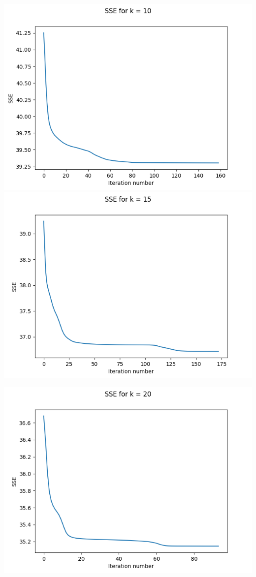 \documentclass{article}
\begin{document}
\begin{center}
    \includegraphics[scale=0.4]{images/task1_5_graph_10.png}
    \includegraphics[scale=0.4]{images/task1_5_graph_15.png}
\end{center}

\begin{center}
    \includegraphics[scale=0.4]{images/task1_5_graph_20.png}
\end{center}
\end{document}
